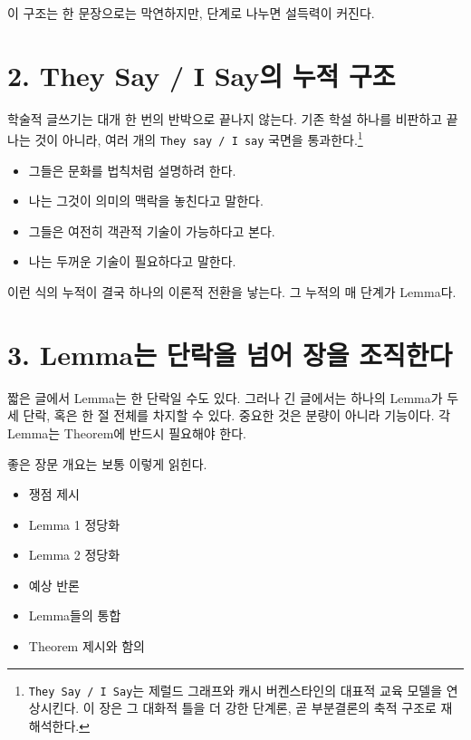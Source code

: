 이 구조는 한 문장으로는 막연하지만, 단계로 나누면 설득력이 커진다.

\section{2. They Say / I Say의 누적 구조}\label{2-they-say--i-sayuxc758-uxb204uxc801-uxad6cuxc870}

학술적 글쓰기는 대개 한 번의 반박으로 끝나지 않는다. 기존 학설 하나를 비판하고 끝나는 것이 아니라, 여러 개의 \texttt{They\ say\ /\ I\ say} 국면을 통과한다.\footnote{\texttt{They\ Say\ /\ I\ Say}는 제럴드 그래프와 캐시 버켄스타인의 대표적 교육 모델을 연상시킨다. 이 장은 그 대화적 틀을 더 강한 단계론, 곧 부분결론의 축적 구조로 재해석한다.}

\begin{itemize}
\tightlist
\item
  그들은 문화를 법칙처럼 설명하려 한다.
\item
  나는 그것이 의미의 맥락을 놓친다고 말한다.
\item
  그들은 여전히 객관적 기술이 가능하다고 본다.
\item
  나는 두꺼운 기술이 필요하다고 말한다.
\end{itemize}

이런 식의 누적이 결국 하나의 이론적 전환을 낳는다. 그 누적의 매 단계가 Lemma다.

\section{3. Lemma는 단락을 넘어 장을 조직한다}\label{3-lemmauxb294-uxb2e8uxb77duxc744-uxb118uxc5b4-uxc7a5uxc744-uxc870uxc9c1uxd55cuxb2e4}

짧은 글에서 Lemma는 한 단락일 수도 있다. 그러나 긴 글에서는 하나의 Lemma가 두세 단락, 혹은 한 절 전체를 차지할 수 있다. 중요한 것은 분량이 아니라 기능이다. 각 Lemma는 Theorem에 반드시 필요해야 한다.

좋은 장문 개요는 보통 이렇게 읽힌다.

\begin{itemize}
\tightlist
\item
  쟁점 제시
\item
  Lemma 1 정당화
\item
  Lemma 2 정당화
\item
  예상 반론
\item
  Lemma들의 통합
\item
  Theorem 제시와 함의
\end{itemize}

